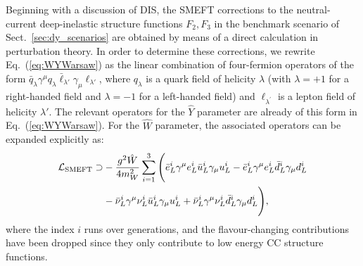 \documentclass[withindex,glossary]{cam-thesis}
\begin{document}
Beginning with a discussion of DIS, the SMEFT corrections to the 
neutral-current deep-inelastic structure 
functions $F_2, F_3$ in the benchmark
scenario of Sect.~\ref{sec:dy_scenarios} are obtained by means of a direct
calculation in perturbation theory.
%
In order to determine these corrections, we rewrite Eq.~(\ref{eq:WYWarsaw})
as the linear combination of four-fermion operators of the form
$\bar{q}_{\lambda} \gamma^{\mu} q_{\lambda} \bar{\ell}_{\lambda'} \gamma_{\mu} \ell_{\lambda'}$,
where $q_\lambda$ is a quark field of helicity $\lambda$ (with $\lambda = +1$ for a
right-handed field and $\lambda=-1$ for a left-handed field) and $\ell_{\lambda^\prime}$ is a
lepton field of helicity $\lambda'$.
%
The relevant operators for the $\hat{Y}$ parameter
are already of this form in Eq.~(\ref{eq:WYWarsaw}).
%
For the $\hat{W}$ parameter,
the associated operators can be expanded explicitly as:
\begin{align}
\label{eq:WYfourfermion}
\mathcal{L}_{\rm SMEFT} \supset   &-\frac{g^2 \hat{W}}{4 m_W^2}  \sum_{i=1}^{3} \Bigg(\bar{e}_L^i \gamma^{\mu} e_L^i\bar{u}_L^i \gamma_{\mu} u_L^i - \bar{e}_L^i \gamma^{\mu} e_L^i \bar{d}_L^i \gamma_{\mu} d_L^i \\&- \bar{\nu}_L^i \gamma^{\mu} \nu_L^i \bar{u}_L^i \gamma_{\mu} u_L^i + \bar{\nu}_L^i \gamma^{\mu} \nu_L^i \bar{d}_L^i \gamma_{\mu} d_L^i  \Bigg), \nonumber
\end{align}
where the index $i$ runs over generations, and the flavour-changing contributions have been dropped since they only contribute to low energy CC structure functions.
\end{document}

